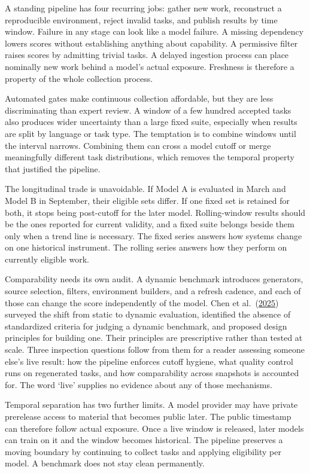 A standing pipeline has four recurring jobs: gather new work, reconstruct a reproducible environment, reject invalid tasks, and publish results by time window. Failure in any stage can look like a model failure. A missing dependency lowers scores without establishing anything about capability. A permissive filter raises scores by admitting trivial tasks. A delayed ingestion process can place nominally new work behind a model's actual exposure. Freshness is therefore a property of the whole collection process.

Automated gates make continuous collection affordable, but they are less discriminating than expert review. A window of a few hundred accepted tasks also produces wider uncertainty than a large fixed suite, especially when results are split by language or task type. The temptation is to combine windows until the interval narrows. Combining them can cross a model cutoff or merge meaningfully different task distributions, which removes the temporal property that justified the pipeline.

The longitudinal trade is unavoidable. If Model A is evaluated in March and Model B in September, their eligible sets differ. If one fixed set is retained for both, it stops being post-cutoff for the later model. Rolling-window results should be the ones reported for current validity, and a fixed suite belongs beside them only when a trend line is necessary. The fixed series answers how systems change on one historical instrument. The rolling series answers how they perform on currently eligible work.

Comparability needs its own audit. A dynamic benchmark introduces generators, source selection, filters, environment builders, and a refresh cadence, and each of those can change the score independently of the model. Chen et al.~(\href{https://arxiv.org/abs/2502.17521}{2025}) surveyed the shift from static to dynamic evaluation, identified the absence of standardized criteria for judging a dynamic benchmark, and proposed design principles for building one. Their principles are prescriptive rather than tested at scale. Three inspection questions follow from them for a reader assessing someone else's live result: how the pipeline enforces cutoff hygiene, what quality control runs on regenerated tasks, and how comparability across snapshots is accounted for. The word `live' supplies no evidence about any of those mechanisms.

Temporal separation has two further limits. A model provider may have private prerelease access to material that becomes public later. The public timestamp can therefore follow actual exposure. Once a live window is released, later models can train on it and the window becomes historical. The pipeline preserves a moving boundary by continuing to collect tasks and applying eligibility per model. A benchmark does not stay clean permanently.

